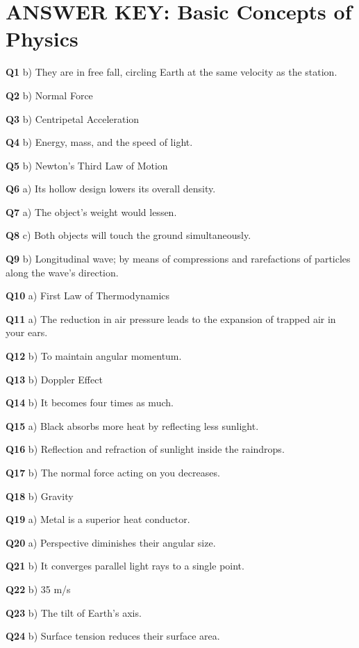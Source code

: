 \section{ANSWER KEY: Basic Concepts of Physics}

\textbf{Q1} b) They are in free fall, circling Earth at the same velocity as the station.\par
\textbf{Q2} b) Normal Force\par
\textbf{Q3} b) Centripetal Acceleration\par
\textbf{Q4} b) Energy, mass, and the speed of light.\par
\textbf{Q5} b) Newton's Third Law of Motion\par
\textbf{Q6} a) Its hollow design lowers its overall density.\par
\textbf{Q7} a) The object's weight would lessen.\par
\textbf{Q8} c) Both objects will touch the ground simultaneously.\par
\textbf{Q9} b) Longitudinal wave; by means of compressions and rarefactions of particles along the wave's direction.\par
\textbf{Q10} a) First Law of Thermodynamics\par
\textbf{Q11} a) The reduction in air pressure leads to the expansion of trapped air in your ears.\par
\textbf{Q12} b) To maintain angular momentum.\par
\textbf{Q13} b) Doppler Effect\par
\textbf{Q14} b) It becomes four times as much.\par
\textbf{Q15} a) Black absorbs more heat by reflecting less sunlight.\par
\textbf{Q16} b) Reflection and refraction of sunlight inside the raindrops.\par
\textbf{Q17} b) The normal force acting on you decreases.\par
\textbf{Q18} b) Gravity\par
\textbf{Q19} a) Metal is a superior heat conductor.\par
\textbf{Q20} a) Perspective diminishes their angular size.\par
\textbf{Q21} b) It converges parallel light rays to a single point.\par
\textbf{Q22} b) 35 m/s\par
\textbf{Q23} b) The tilt of Earth's axis.\par
\textbf{Q24} b) Surface tension reduces their surface area.\par
